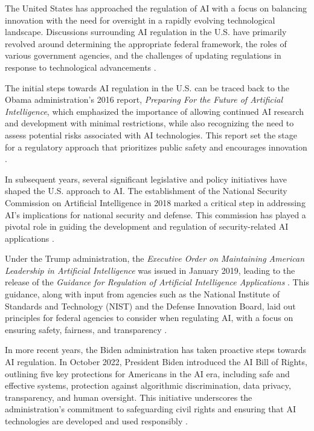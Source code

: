The United States has approached the regulation of AI with a focus on balancing innovation with the need for oversight in a rapidly evolving technological landscape. Discussions surrounding AI regulation in the U.S. have primarily revolved around determining the appropriate federal framework, the roles of various government agencies, and the challenges of updating regulations in response to technological advancements \cite{weaver2018regulation}.

The initial steps towards AI regulation in the U.S. can be traced back to the Obama administration's 2016 report, \textit{Preparing For the Future of Artificial Intelligence}, which emphasized the importance of allowing continued AI research and development with minimal restrictions, while also recognizing the need to assess potential risks associated with AI technologies. This report set the stage for a regulatory approach that prioritizes public safety and encourages innovation \cite{obama_ai_2016}.

In subsequent years, several significant legislative and policy initiatives have shaped the U.S. approach to AI. The establishment of the National Security Commission on Artificial Intelligence in 2018 marked a critical step in addressing AI's implications for national security and defense. This commission has played a pivotal role in guiding the development and regulation of security-related AI applications \cite{nscai_2021}.

Under the Trump administration, the \textit{Executive Order on Maintaining American Leadership in Artificial Intelligence} was issued in January 2019, leading to the release of the \textit{Guidance for Regulation of Artificial Intelligence Applications} \cite{executive_order_maintaining_ai_leadership_2019, omb_memo_regulation_ai_2020}. This guidance, along with input from agencies such as the National Institute of Standards and Technology (NIST) and the Defense Innovation Board, laid out principles for federal agencies to consider when regulating AI, with a focus on ensuring safety, fairness, and transparency \cite{wikipedia_ai_regulation}.

In more recent years, the Biden administration has taken proactive steps towards AI regulation. In October 2022, President Biden introduced the AI Bill of Rights, outlining five key protections for Americans in the AI era, including safe and effective systems, protection against algorithmic discrimination, data privacy, transparency, and human oversight. This initiative underscores the administration's commitment to safeguarding civil rights and ensuring that AI technologies are developed and used responsibly \cite{ai_bill_of_rights_2022}.

